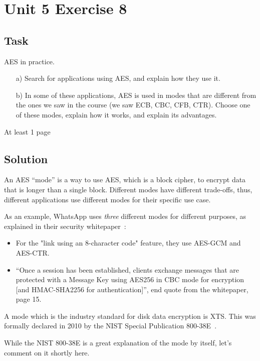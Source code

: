 \section{Unit 5 Exercise 8}

\subsection{Task}
AES in practice.

\begin{enumerate}
    \item[a)] Search for applications using AES, and explain how they use it.
    \item[b)] In some of these applications, AES is used in modes that are different from the ones we saw in the course (we saw ECB, CBC, CFB, CTR). Choose one of these modes, explain how it works, and explain its advantages.
\end{enumerate}

At least 1 page

\subsection{Solution}

An AES ``mode'' is a way to use AES, which is a block cipher, to encrypt data that is longer than a single block.
Different modes have different trade-offs, thus, different applications use different modes for their specific use case.

As an example, WhatsApp uses \textit{three} different modes for different purposes, as explained in their security whitepaper~\cite{whatsapp}:
\begin{itemize}
    \item For the "link using an 8-character code" feature, they use AES-GCM and AES-CTR.
    \item ``Once a session has been established, clients exchange messages that are protected with a Message Key using AES256 in CBC mode for encryption [and HMAC-SHA2256 for authentication]'', end quote from the whitepaper, page 15.
\end{itemize}

A mode which is the industry standard for disk data encryption is XTS\@.
This was formally declared in 2010 by the NIST Special Publication 800-38E~\cite{NIST-XTS}.

While the NIST 800-38E is a great explanation of the mode by itself, let's comment on it shortly here.

